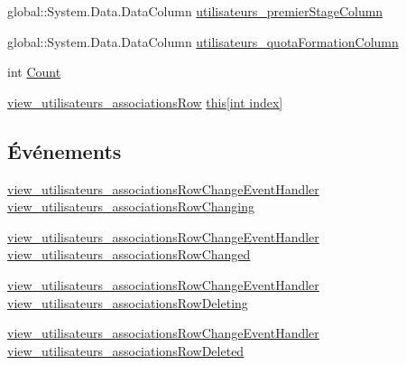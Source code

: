 \begin{DoxyCompactItemize}
global\+::\+System.\+Data.\+Data\+Column \hyperlink{classforma_1_1formadb_data_set_1_1view__utilisateurs__associations_data_table_a38a69352055e1a80822aad461f44f51c}{utilisateurs\+\_\+premier\+Stage\+Column}
\item 
global\+::\+System.\+Data.\+Data\+Column \hyperlink{classforma_1_1formadb_data_set_1_1view__utilisateurs__associations_data_table_a197320ef3d1faf4e589d5c8a0801a9cb}{utilisateurs\+\_\+quota\+Formation\+Column}
\item 
int \hyperlink{classforma_1_1formadb_data_set_1_1view__utilisateurs__associations_data_table_ab63e855bd4008cb40e3c1af84cb6c403}{Count}
\item 
\hyperlink{classforma_1_1formadb_data_set_1_1view__utilisateurs__associations_row}{view\+\_\+utilisateurs\+\_\+associations\+Row} \hyperlink{classforma_1_1formadb_data_set_1_1view__utilisateurs__associations_data_table_ad9b9e6c6864b81334063ff5855491865}{this\mbox{[}int index\mbox{]}}
\end{DoxyCompactItemize}
\subsection*{Événements}
\begin{DoxyCompactItemize}
\item 
\hyperlink{classforma_1_1formadb_data_set_a38e27bcaaf1b6cd5ec25baa6da0ac23b}{view\+\_\+utilisateurs\+\_\+associations\+Row\+Change\+Event\+Handler} \hyperlink{classforma_1_1formadb_data_set_1_1view__utilisateurs__associations_data_table_a095f1ef306f369a7d98f32f6538aeeda}{view\+\_\+utilisateurs\+\_\+associations\+Row\+Changing}
\item 
\hyperlink{classforma_1_1formadb_data_set_a38e27bcaaf1b6cd5ec25baa6da0ac23b}{view\+\_\+utilisateurs\+\_\+associations\+Row\+Change\+Event\+Handler} \hyperlink{classforma_1_1formadb_data_set_1_1view__utilisateurs__associations_data_table_af6f07ef76151ca8eaf96c3bd14741644}{view\+\_\+utilisateurs\+\_\+associations\+Row\+Changed}
\item 
\hyperlink{classforma_1_1formadb_data_set_a38e27bcaaf1b6cd5ec25baa6da0ac23b}{view\+\_\+utilisateurs\+\_\+associations\+Row\+Change\+Event\+Handler} \hyperlink{classforma_1_1formadb_data_set_1_1view__utilisateurs__associations_data_table_a11270426f0c42b257987473745ccd43b}{view\+\_\+utilisateurs\+\_\+associations\+Row\+Deleting}
\item 
\hyperlink{classforma_1_1formadb_data_set_a38e27bcaaf1b6cd5ec25baa6da0ac23b}{view\+\_\+utilisateurs\+\_\+associations\+Row\+Change\+Event\+Handler} \hyperlink{classforma_1_1formadb_data_set_1_1view__utilisateurs__associations_data_table_af05c076256e745fc225f671c1a35b40b}{view\+\_\+utilisateurs\+\_\+associations\+Row\+Deleted}
\end{DoxyCompactItemize}


